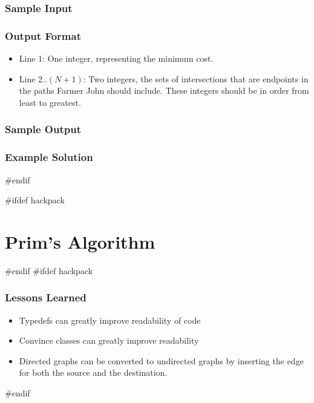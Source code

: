 \subsubsection{Sample Input}
\subsubsection{Output Format}
\begin{itemize}
	\item Line 1: One integer, representing the minimum cost.
	\item Line 2..$(N+1)$: Two integers, the sets of intersections that are endpoints in the paths Farmer John should include. These integers should be in order from least to greatest.
\end{itemize}
\subsubsection{Sample Output}
\subsubsection{Example Solution}
#endif

#ifdef hackpack
\section{Prim's Algorithm}
#endif
#ifdef hackpack
\subsubsection{Lessons Learned}
\begin{itemize}
	\item Typedefs can greatly improve readability of code
	\item Convince classes can greatly improve readability
	\item Directed graphs can be converted to undirected graphs by inserting the edge for both the source and the destination.
\end{itemize}
#endif

